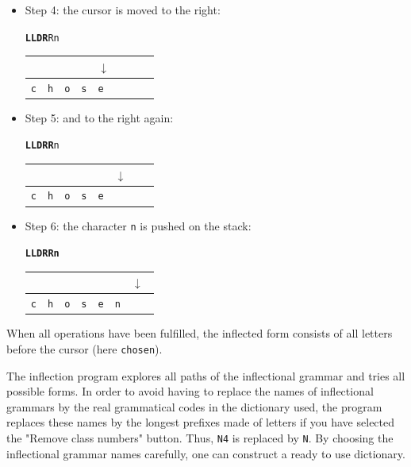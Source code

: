 \begin{itemize}
\bigskip
\item Step 4: the cursor is moved to the right:

\begin{center}
\texttt{\textbf{LLDR}Rn}

\begin{tabular}{|l|l|l|l|l|l|l|l}
\multicolumn{4}{l}{} & \multicolumn{4}{l}{$\downarrow$} \\
\hline
\verb+c+ & \verb+h+ & \verb+o+ & \verb+s+ & \verb+e+ & \verb+ + & \verb+ + & \\
\hline
\end{tabular}
\end{center}

\bigskip
\item Step 5: and to the right again:

\begin{center}
\texttt{\textbf{LLDRR}n}

\begin{tabular}{|l|l|l|l|l|l|l|l}
\multicolumn{5}{l}{} & \multicolumn{3}{l}{$\downarrow$} \\
\hline
\verb+c+ & \verb+h+ & \verb+o+ & \verb+s+ & \verb+e+ & \verb+ + & \verb+ + & \\
\hline
\end{tabular}
\end{center}

\bigskip
\item Step 6: the character \verb+n+ is pushed on the stack:

\begin{center}
\texttt{\textbf{LLDRRn}}

\begin{tabular}{|l|l|l|l|l|l|l|l}
\multicolumn{6}{l}{} & \multicolumn{2}{l}{$\downarrow$} \\
\hline
\verb+c+ & \verb+h+ & \verb+o+ & \verb+s+ & \verb+e+ & \verb+n+ & \verb+ + & \\
\hline
\end{tabular}
\end{center}
\end{itemize}

\bigskip
\noindent When all operations have been fulfilled, the inflected form
consists of all letters before the cursor (here \verb+chosen+).

\bigskip
\noindent The inflection program
explores all paths of the inflectional grammar and tries all possible forms. In
order to avoid having to replace the names of inflectional grammars by the real
grammatical codes in the dictionary used, the program replaces these names by the
longest prefixes made of letters if you have selected the "Remove class numbers"
button. Thus, \verb+N4+ is replaced by \verb+N+. By choosing the inflectional
grammar names carefully, one can construct a ready to use dictionary.

